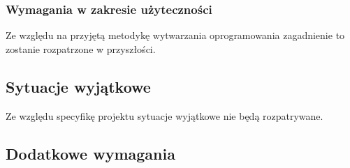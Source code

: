 \subsubsection{Wymagania w zakresie użyteczności}


Ze względu na przyjętą metodykę wytwarzania oprogramowania zagadnienie to zostanie rozpatrzone w przyszłości.





\subsection{Sytuacje wyjątkowe}


Ze względu specyfikę projektu sytuacje wyjątkowe nie będą rozpatrywane.





\subsection{Dodatkowe wymagania}


